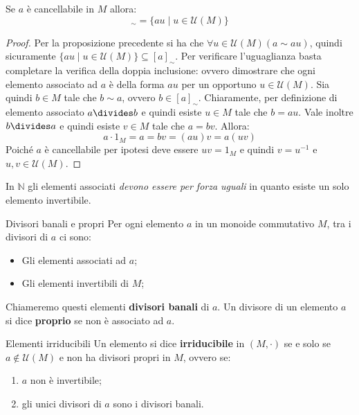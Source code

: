 \begin{propbox}
	Se $a$ è cancellabile in $M$ allora:
	\begin{displaymath}
		[a]_{\sim} = \{au \; | \; u \in \mathcal{U}(M)\}
	\end{displaymath}
\end{propbox}

\begin{proof}
	Per la proposizione precedente si ha che $\forall u \in \mathcal{U}(M) (a \sim au)$, quindi sicuramente $\{au \; | \; u \in \mathcal{U}(M)\} \subseteq [a]_{\sim}$. Per verificare l'uguaglianza basta completare la verifica della doppia inclusione: ovvero dimostrare che ogni elemento associato ad $a$ è della forma $au$ per un opportuno $u \in \mathcal{U}(M)$. Sia quindi $b \in M$ tale che $b \sim a$, ovvero $b \in [a]_{\sim}$. Chiaramente, per definizione di elemento associato $a \divides b$ e quindi esiste $u \in M$ tale che $b = au$. Vale inoltre $b \divides a$ e quindi esiste $v \in M$ tale che $a = bv$. Allora:
	\begin{displaymath}
		a \cdot 1_{M} = a = bv = (au)v = a (uv)
	\end{displaymath}
	Poiché $a$ è cancellabile per ipotesi deve essere $uv = 1_{M}$ e quindi $v = u^{-1}$ e $u,v \in \mathcal{U}(M)$.
\end{proof} 

\begin{osservation}
	In $\mathbb{N}$ gli elementi associati \textit{devono essere per forza uguali} in quanto esiste un solo elemento invertibile.
\end{osservation}

\begin{defbox}{Divisori banali e propri}
	Per ogni elemento $a$ in un monoide commutativo $M$, tra i divisori di $a$ ci sono:
	\begin{itemize}
		\item Gli elementi associati ad $a$;
		\item Gli elementi invertibili di $M$;
	\end{itemize}
	Chiameremo questi elementi \textbf{divisori banali} di $a$.	Un divisore di un elemento $a$ si dice \textbf{proprio} se non è associato ad $a$.
\end{defbox}

\begin{defbox}{Elementi irriducibili}
	Un elemento si dice \textbf{irriducibile} in $(M,\cdot)$ se e solo se $a \notin \mathcal{U}(M)$ e non ha divisori propri in $M$, ovvero se:
	\begin{enumerate}
		\item $a$ non è invertibile;
		\item gli unici divisori di $a$ sono i divisori banali.
	\end{enumerate}
\end{defbox}

